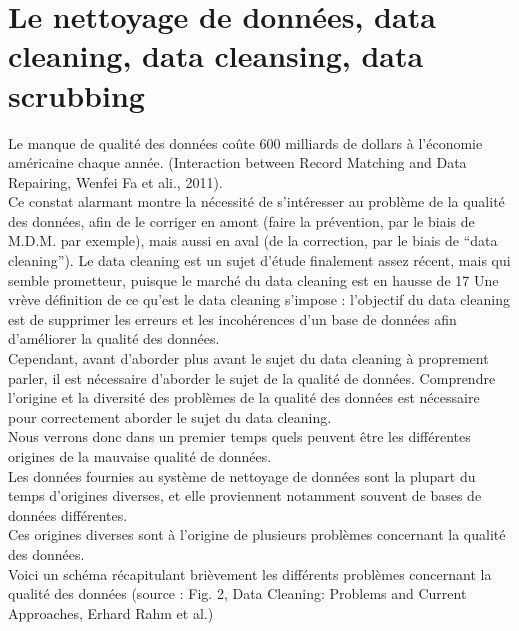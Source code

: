 \section{Le nettoyage de données, data cleaning, data cleansing, data scrubbing}

Le manque de qualité des données coûte 600 milliards de dollars à l’économie américaine chaque année. (Interaction between Record Matching and Data Repairing, Wenfei Fa et ali., 2011).\\
Ce constat alarmant montre la nécessité de s’intéresser au problème de la qualité des données, afin de le corriger en amont (faire la prévention, par le biais de M.D.M. par exemple), mais aussi en aval (de la correction, par le biais de “data cleaning”).
Le data cleaning est un sujet d’étude finalement assez récent, mais qui semble prometteur, puisque le marché du data cleaning est en hausse de 17%
Une vrève définition de ce qu’est le data cleaning s’impose : l’objectif du data cleaning est de supprimer les erreurs et les incohérences d’un base de données afin d’améliorer la qualité des données.\\
Cependant, avant d’aborder plus avant le sujet du data cleaning à proprement parler, il est nécessaire d’aborder le sujet de la qualité de données. Comprendre l’origine et la diversité des problèmes de la qualité des données est nécessaire pour correctement aborder le sujet du data cleaning.\\
Nous verrons donc dans un premier temps quels peuvent être les différentes origines de la mauvaise qualité de données.\\
Les données fournies au système de nettoyage de données sont la plupart du temps d’origines diverses, et elle proviennent notamment souvent de bases de données différentes.\\
Ces origines diverses sont à l’origine de plusieurs problèmes concernant la qualité des données.\\
Voici un schéma récapitulant brièvement les différents problèmes concernant la qualité des données (source : Fig. 2, Data Cleaning: Problems and Current Approaches, Erhard Rahm et al.)

